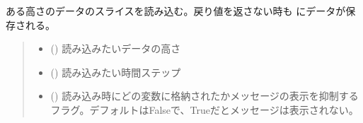 \documentclass[letterpaper,10pt,dvipdfmx,report]{sphinxmanual}
\begin{document}
\begin{fulllineitems}
\label{\detokenize{io:R2D2.R2D2_data.read_qq_select}}
\pysigstartsignatures
{}
\pysigstopsignatures
\sphinxAtStartPar
ある高さのデータのスライスを読み込む。戻り値を返さない時も {\hyperref[\detokenize{io:R2D2.R2D2_data.qs}]{}} にデータが保存される。
\begin{quote}\begin{description}
\begin{itemize}
\item {} 
\sphinxAtStartPar
{} () \sphinxhyphen{}\sphinxhyphen{} 読み込みたいデータの高さ

\item {} 
\sphinxAtStartPar
{} () \sphinxhyphen{}\sphinxhyphen{} 読み込みたい時間ステップ

\item {} 
\sphinxAtStartPar
{} () \sphinxhyphen{}\sphinxhyphen{} 読み込み時にどの変数に格納されたかメッセージの表示を抑制するフラグ。デフォルトはFalseで、Trueだとメッセージは表示されない。

\end{itemize}

\end{description}\end{quote}

\end{fulllineitems}

\end{document}
